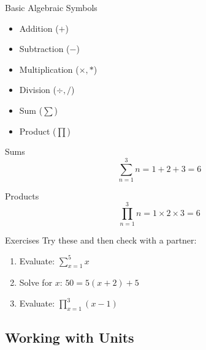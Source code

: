 \documentclass[]{beamer}
\begin{document}
    \begin{frame}{Basic Algebraic Symbols}
        \begin{itemize}
            \item<2-> Addition ($+$)
            \item<2-> Subtraction ($-$)            
            \item<2-> Multiplication ($\times, *$)
            \item<2-> Division ($\div, /$)
            \item<3-> Sum ($\sum$)
            \item<3-> Product ($\prod$)
        \end{itemize}
    \end{frame}

    \begin{frame}{Sums}
        $$ \sum_{n=1}^3 n = 1 + 2 + 3 = 6 $$
    \end{frame}

    \begin{frame}{Products}
        $$ \prod_{n=1}^3 n = 1 \times 2 \times 3 = 6 $$
    \end{frame}

    \begin{frame}{Exercises}
        Try these and then check with a partner:
        \begin{enumerate}
            \item Evaluate: $\sum\limits_{x=1}^5 x$ 
            \item Solve for $x$: $50 = 5(x+2) + 5$            
            \item Evaluate: $\prod\limits_{x=1}^3 (x-1)$
        \end{enumerate}
    \end{frame}

\subsection{Working with Units}
\end{document}
